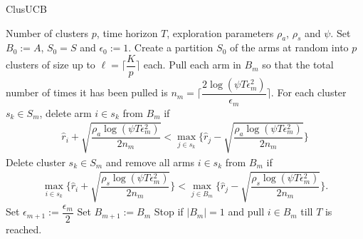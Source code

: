 \begin{algorithm}[!h]
\caption{ClusUCB}
\label{alg:clusucb}
\begin{algorithmic}
 Number of clusters $p$, time horizon $T$, exploration parameters $\rho_a$, $\rho_s$ and $\psi$.
 Set $B_{0}:=A$, $S_0 = S$ and $\epsilon_{0}:=1$.
\State Create a partition $S_0$ of the arms at random into $p$ clusters of size up to $\ell=\bigg\lceil \dfrac{K}{p} \bigg\rceil$ each.
\State Pull each arm in $B_m$ so that the total number of times it has been pulled is $n_{m}=\bigg\lceil\dfrac{2\log{(\psi T\epsilon_{m}^{2})}}{\epsilon_{m}}\bigg\rceil$. 
\ArmElim
\State For each cluster $s_k \in S_{m}$, delete arm ${i}\in s_{k}$ from $B_{m}$ if
\begin{align*}
\hat{r}_{i} + \sqrt{\dfrac{\rho_{a}\log{(\psi T\epsilon_{m}^{2})}}{2 n_{m}}}  < \max_{{j}\in s_{k}}\bigg\lbrace\hat{r}_{j} -\sqrt{\dfrac{\rho_{a}\log{(\psi T\epsilon_{m}^{2})}}{2 n_{m}}} \bigg\rbrace
\end{align*}
\EndArmElim
\ClusElim
\State Delete cluster $s_{k}\in S_{m}$ and remove all arms $i\in s_{k}$ from $B_{m}$ if 
\begin{align*}
 \max_{{i}\in s_{k}}\bigg\lbrace\hat{r}_{i} + \sqrt{\dfrac{\rho_{s}\log{(\psi T\epsilon_{m}^{2})}}{2 n_{m}}}\bigg\rbrace  < \max_{{j}\in B_{m}} \bigg\lbrace\hat{r}_{j} - \sqrt{\dfrac{\rho_{s} \log{(\psi T\epsilon_{m}^{2})}}{2 n_{m}}}\bigg\rbrace.
\end{align*}
\EndClusElim
\State Set $\epsilon_{m+1}:=\dfrac{\epsilon_{m}}{2}$\vspace{0.5ex}
\State Set $B_{m+1}:=B_{m}$
\State Stop if $|B_{m}|=1$ and pull ${i}\in B_{m}$ till $T$ is reached.
\EndFor
\end{algorithmic}
\end{algorithm}



